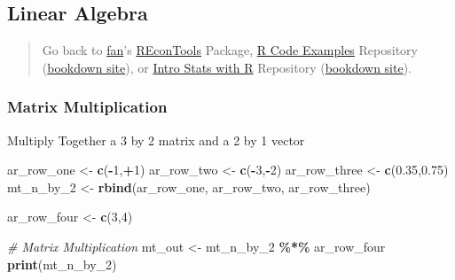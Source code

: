 \documentclass[
]{book}
\newenvironment{Shaded}{\begin{snugshade}}{\end{snugshade}}
\newcommand{\CommentTok}[1]{\textcolor[rgb]{0.56,0.35,0.01}{\textit{#1}}}
\newcommand{\DecValTok}[1]{\textcolor[rgb]{0.00,0.00,0.81}{#1}}
\newcommand{\FloatTok}[1]{\textcolor[rgb]{0.00,0.00,0.81}{#1}}
\newcommand{\KeywordTok}[1]{\textcolor[rgb]{0.13,0.29,0.53}{\textbf{#1}}}
\newcommand{\NormalTok}[1]{#1}
\newcommand{\OperatorTok}[1]{\textcolor[rgb]{0.81,0.36,0.00}{\textbf{#1}}}
\newcommand{\StringTok}[1]{\textcolor[rgb]{0.31,0.60,0.02}{#1}}
\begin{document}
\hypertarget{linear-algebra}{%
\subsection{Linear Algebra}\label{linear-algebra}}

\begin{quote}
Go back to \href{http://fanwangecon.github.io/}{fan}'s \href{https://fanwangecon.github.io/REconTools/}{REconTools} Package, \href{https://fanwangecon.github.io/R4Econ/}{R Code Examples} Repository (\href{https://fanwangecon.github.io/R4Econ/bookdown}{bookdown site}), or \href{https://fanwangecon.github.io/Stat4Econ/}{Intro Stats with R} Repository (\href{https://fanwangecon.github.io/Stat4Econ/bookdown}{bookdown site}).
\end{quote}

\hypertarget{matrix-multiplication}{%
\subsubsection{Matrix Multiplication}\label{matrix-multiplication}}

Multiply Together a 3 by 2 matrix and a 2 by 1 vector

\begin{Shaded}
\begin{Highlighting}[]
\NormalTok{ar\_row\_one \textless{}{-}}\StringTok{ }\KeywordTok{c}\NormalTok{(}\OperatorTok{{-}}\DecValTok{1}\NormalTok{,}\OperatorTok{+}\DecValTok{1}\NormalTok{)}
\NormalTok{ar\_row\_two \textless{}{-}}\StringTok{ }\KeywordTok{c}\NormalTok{(}\OperatorTok{{-}}\DecValTok{3}\NormalTok{,}\OperatorTok{{-}}\DecValTok{2}\NormalTok{)}
\NormalTok{ar\_row\_three \textless{}{-}}\StringTok{ }\KeywordTok{c}\NormalTok{(}\FloatTok{0.35}\NormalTok{,}\FloatTok{0.75}\NormalTok{)}
\NormalTok{mt\_n\_by\_}\DecValTok{2}\NormalTok{ \textless{}{-}}\StringTok{ }\KeywordTok{rbind}\NormalTok{(ar\_row\_one, ar\_row\_two, ar\_row\_three)}

\NormalTok{ar\_row\_four \textless{}{-}}\StringTok{ }\KeywordTok{c}\NormalTok{(}\DecValTok{3}\NormalTok{,}\DecValTok{4}\NormalTok{)}

\CommentTok{\# Matrix Multiplication}
\NormalTok{mt\_out \textless{}{-}}\StringTok{ }\NormalTok{mt\_n\_by\_}\DecValTok{2} \OperatorTok{\%*\%}\StringTok{ }\NormalTok{ar\_row\_four}
\KeywordTok{print}\NormalTok{(mt\_n\_by\_}\DecValTok{2}\NormalTok{)}
\end{Highlighting}
\end{Shaded}
\end{document}
